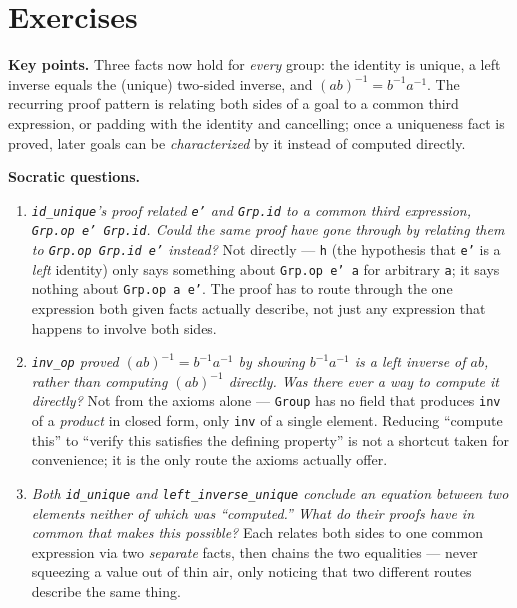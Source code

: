 \section{Exercises}\label{sec:07-group-theorems:05-exercises:1}

\textbf{Key points.} Three facts now hold for \emph{every} group: the identity is unique, a left inverse equals the (unique) two-sided inverse, and \((ab)^{-1}=b^{-1}a^{-1}\). The recurring proof pattern is relating both sides of a goal to a common third expression, or padding with the identity and cancelling; once a uniqueness fact is proved, later goals can be \emph{characterized} by it instead of computed directly.

\textbf{Socratic questions.}

\begin{enumerate}
\def\labelenumi{\arabic{enumi}.}
\item
  \emph{\texttt{id\_\allowbreak{}unique}'s proof related \texttt{e'} and \texttt{Grp.id} to a common third expression, \texttt{Grp.op e' Grp.id}. Could the same proof have gone through by relating them to \texttt{Grp.op Grp.id e'} instead?} Not directly --- \texttt{h} (the hypothesis that \texttt{e'} is a \emph{left} identity) only says something about \texttt{Grp.op e' a} for arbitrary \texttt{a}; it says nothing about \texttt{Grp.op a e'}. The proof has to route through the one expression both given facts actually describe, not just any expression that happens to involve both sides.
\item
  \emph{\texttt{inv\_\allowbreak{}op} proved \((ab)^{-1}=b^{-1}a^{-1}\) by showing \(b^{-1}a^{-1}\) is a left inverse of \(ab\), rather than computing \((ab)^{-1}\) directly. Was there ever a way to compute it directly?} Not from the axioms alone --- \texttt{Group} has no field that produces \texttt{inv} of a \emph{product} in closed form, only \texttt{inv} of a single element. Reducing ``compute this'' to ``verify this satisfies the defining property'' is not a shortcut taken for convenience; it is the only route the axioms actually offer.
\item
  \emph{Both \texttt{id\_\allowbreak{}unique} and \texttt{left\_\allowbreak{}inverse\_\allowbreak{}unique} conclude an equation between two elements neither of which was ``computed.'' What do their proofs have in common that makes this possible?} Each relates both sides to one common expression via two \emph{separate} facts, then chains the two equalities --- never squeezing a value out of thin air, only noticing that two different routes describe the same thing.

\end{enumerate}
